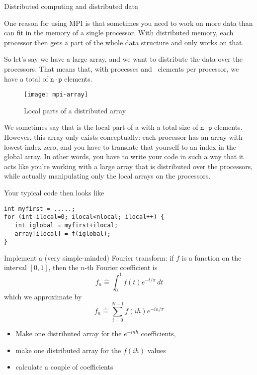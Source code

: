 
 {Distributed computing and distributed data}

One reason for using MPI is that sometimes you need to work on
more data than can fit in the memory of a single processor.
With distributed memory, each processor then gets a part
of the whole data structure and only works on that.

So let's say we have a large array, and we want to
distribute the data over the processors.
That means that, with  processes and ~elements
per processor, we have a total of $\mathtt{n}\cdot\mathtt{p}$
elements.

\begin{figure}[ht]
  \texttt{[image: mpi-array]}
  \caption{Local parts of a distributed array}
  \label{fig:mpi-array}
\end{figure}

We sometimes say that  is the local part
of a  with a total size of
$\mathtt{n}\cdot\mathtt{p}$
elements.
However, this array only exists
conceptually: each processor has an array with lowest index zero,
and you have to translate that yourself to an index in the global
array.
In other words, you have to write your code in such a way that
it acts like you're working with a large array that is distributed
over the processors, while
actually manipulating only the local arrays on the processors.

Your typical code then looks like

\lstset{style=reviewcode,language=C} %
\begin{lstlisting}
int myfirst = .....;
for (int ilocal=0; ilocal<nlocal; ilocal++) {
   int iglobal = myfirst+ilocal;
   array[ilocal] = f(iglobal);
}
\end{lstlisting}

\begin{exercise}
  \label{ex:fft-vector}
  Implement a (very simple-minded) Fourier transform: if $f$ is a
  function on the interval $[0,1]$, then the $n$-th Fourier
  coefficient is
  \[ f_n\hat = \int_0^1 f(t)e^{-t/\pi}\,dt \]
  which we approximate by
  \[ f_n\hat = \sum_{i=0}^{N-1} f(ih)e^{-in/\pi} \]
  \begin{itemize}
  \item Make one distributed array for the $e^{-inh}$ coefficients,
  \item make one distributed array for the $f(ih)$ values
  \item calculate a couple of coefficients
  \end{itemize}
\end{exercise}

